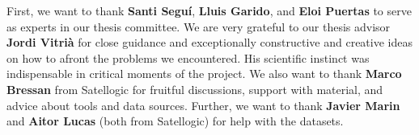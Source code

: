 \documentclass[
11pt, %
english, %
onehalfspacing, %
liststotoc, %
headsepline, %
]{MastersDoctoralThesis} %
\begin{document}

\begin{acknowledgements}
\addchaptertocentry{\acknowledgementname} %

First, we want to thank \textbf{Santi Seguí}, \textbf{Lluis Garido}, and \textbf{Eloi Puertas} to serve as experts in our thesis committee.
We are very grateful to our thesis advisor \textbf{Jordi Vitrià} for close guidance and exceptionally constructive and creative ideas on how to afront the problems we encountered. His scientific instinct was indispensable in critical moments of the project.
We also want to thank \textbf{Marco Bressan} from Satellogic for fruitful discussions, support with material, and advice about tools and data sources. Further, we want to thank \textbf{Javier Marin} and \textbf{Aitor Lucas} (both from Satellogic) for help with the datasets.

\end{acknowledgements}




\mainmatter %

\pagestyle{thesis} %



\tableofcontents



 
 





\appendix %
\end{document}
